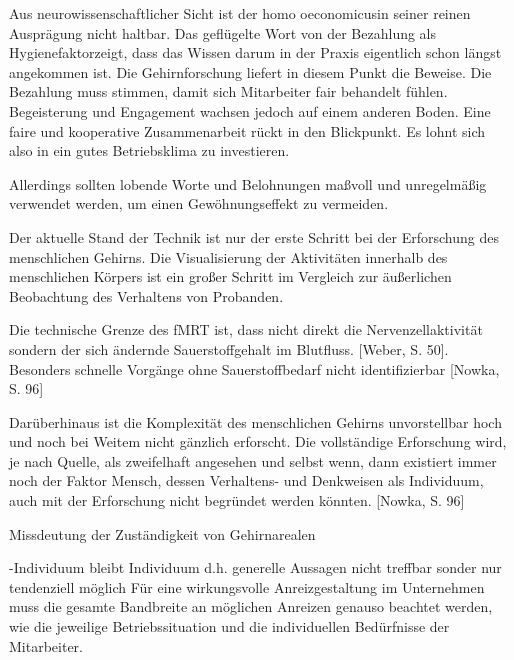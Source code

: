 \glqq Aus neurowissenschaftlicher Sicht ist der \glqq homo oeconomicus\grqq in seiner reinen Ausprägung nicht haltbar. Das geflügelte Wort von \glqq der Bezahlung als Hygienefaktor\grqq zeigt, dass das Wissen darum in der Praxis eigentlich schon längst angekommen ist. Die Gehirnforschung liefert in diesem Punkt die Beweise. Die Bezahlung muss stimmen, damit sich Mitarbeiter fair behandelt fühlen. Begeisterung und Engagement wachsen jedoch auf einem anderen Boden. Eine faire und kooperative Zusammenarbeit rückt in den Blickpunkt. Es lohnt sich also in ein gutes Betriebsklima zu investieren.\grqq [Seelbach, S. 19]



Allerdings sollten lobende Worte und Belohnungen maßvoll und unregelmäßig verwendet werden, um einen Gewöhnungseffekt zu vermeiden.\grqq [Nowka, S. 88]


Der aktuelle Stand der Technik ist nur der erste Schritt bei der Erforschung des menschlichen Gehirns. Die Visualisierung der Aktivitäten innerhalb des menschlichen Körpers ist ein großer Schritt im Vergleich zur äußerlichen Beobachtung des Verhaltens von Probanden. 

Die technische Grenze des fMRT ist, dass nicht direkt die Nervenzellaktivität sondern der sich ändernde Sauerstoffgehalt im Blutfluss. [Weber, S. 50]. Besonders schnelle Vorgänge ohne Sauerstoffbedarf nicht identifizierbar [Nowka, S. 96]

Darüberhinaus ist die Komplexität des menschlichen Gehirns unvorstellbar hoch und noch bei Weitem nicht gänzlich erforscht. Die vollständige Erforschung wird, je nach Quelle, als zweifelhaft angesehen und selbst wenn, dann existiert immer noch der Faktor Mensch, dessen Verhaltens- und Denkweisen als Individuum, auch mit der Erforschung nicht begründet werden könnten. [Nowka, S. 96]

Missdeutung der Zuständigkeit von Gehirnarealen

-Individuum bleibt Individuum d.h. generelle Aussagen nicht treffbar sonder nur tendenziell möglich
\newline \glqq Für eine wirkungsvolle Anreizgestaltung im Unternehmen muss die gesamte Bandbreite an möglichen Anreizen genauso beachtet werden, wie die jeweilige Betriebssituation und die individuellen Bedürfnisse der Mitarbeiter.\grqq \citep[S. 54]{Nowka.2013}



